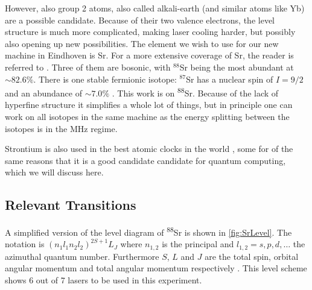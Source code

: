 However, also group 2 atoms, also called alkali-earth (and similar atoms like Yb) are a possible candidate. Because of their two valence electrons, the level structure is much more complicated, making laser cooling harder, but possibly also opening up new possibilities. The element we wish to use for our new machine in Eindhoven is Sr. For a more extensive coverage of Sr, the reader is referred to \cite{Stellmer2013}. Three of them are bosonic, with ${}^{88}$Sr being the most abundant at $\sim82.6\%$. There is one stable fermionic isotope: ${}^{87}$Sr has a nuclear spin of $I=9/2$ and an abundance of $\sim7.0\%$ \cite{Coursey1999}. This work is on \textsuperscript{88}Sr. Because of the lack of hyperfine structure it simplifies a whole lot of things, but in principle one can work on all isotopes in the same machine as the energy splitting between the isotopes is in the MHz regime. 

Strontium is also used in the best atomic clocks in the world \cite{Bloom2014}, some for of the same reasons that it is a good candidate candidate for quantum computing, which we will discuss here. 

\subsection{Relevant Transitions}

A simplified version of the level diagram of \textsuperscript{88}Sr is shown in \cref{fig:SrLevel}. The notation is $(n_1l_1 n_2l_2)^{2S+1}L_J$ where $n_{1,2}$ is the principal and $l_{1,2} = s, p, d, \ldots$ the azimuthal quantum number. Furthermore $S$, $L$ and $J$ are the total spin, orbital angular momentum and total angular momentum respectively \cite{Cowan1981}.  This level scheme shows 6 out of 7 lasers to be used in this experiment. 

